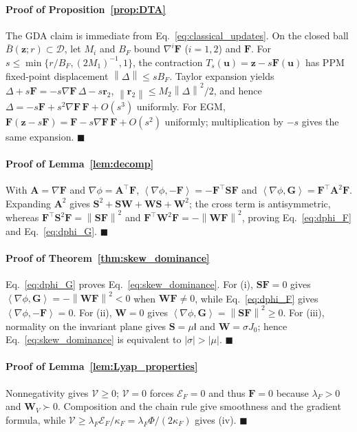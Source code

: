 \documentclass{article}
\theoremstyle{remark}
\newcommand{\inner}[2]{\left\langle #1,#2\right\rangle}
\newcommand{\norm}[1]{\left\lVert #1\right\rVert}
\newcommand{\Id}{\mathsf{I}}
\newcommand{\cD}{\mathcal{D}}
\newcommand{\bz}{\boldsymbol{z}}
\newcommand{\bu}{\boldsymbol{u}}
\newcommand{\bW}{\boldsymbol{W}}
\newcommand{\bS}{\boldsymbol{S}}
\newcommand{\bA}{\boldsymbol{A}}
\newcommand{\bF}{\boldsymbol{F}}
\newcommand{\bG}{\boldsymbol{G}}
\newcommand{\Vk}{\mathcal{V}}
\newcommand{\cE}{\mathcal{E}}
\begin{document}
\paragraph{Proof of Proposition~\ref{prop:DTA}}\label{app:DTA}
The GDA claim is immediate from Eq.~\eqref{eq:classical_updates}.
On the closed ball $\bar B(\bz;r)\subset\cD$, let $M_i$ and $B_F$ bound $\nabla^i\bF$ ($i=1,2$) and $\bF$.
For $s\le\min\{r/B_F,(2M_1)^{-1},1\}$, the contraction $T_s(\bu)=\bz-s\bF(\bu)$ has PPM fixed-point displacement $\norm{\Delta}\le sB_F$.
Taylor expansion yields $\Delta+s\bF=-s\nabla\bF\,\Delta-s\mathbf r_2$, $\norm{\mathbf r_2}\le M_2\norm{\Delta}^2/2$, and hence $\Delta=-s\bF+s^2\nabla\bF\,\bF+O(s^3)$ uniformly.
For EGM, $\bF(\bz-s\bF)=\bF-s\nabla\bF\,\bF+O(s^2)$ uniformly; multiplication by $-s$ gives the same expansion.
\hfill$\blacksquare$

\paragraph{Proof of Lemma~\ref{lem:decomp}}\label{app:decomp}
With $\bA=\nabla\bF$ and $\nabla\phi=\bA^\top\bF$, $\inner{\nabla\phi}{-\bF}=-\bF^\top\bS\bF$ and $\inner{\nabla\phi}{\bG}=\bF^\top\bA^2\bF$.
Expanding $\bA^2$ gives $\bS^2+\bS\bW+\bW\bS+\bW^2$; the cross term is antisymmetric, whereas $\bF^\top\bS^2\bF=\norm{\bS\bF}^2$ and $\bF^\top\bW^2\bF=-\norm{\bW\bF}^2$, proving Eq.~\eqref{eq:dphi_F} and Eq.~\eqref{eq:dphi_G}.
\hfill$\blacksquare$

\paragraph{Proof of Theorem~\ref{thm:skew_dominance}}\label{app:skew_dominance}
Eq.~\eqref{eq:dphi_G} proves Eq.~\eqref{eq:skew_dominance}.
For (i), $\bS\bF=0$ gives $\inner{\nabla\phi}{\bG}=-\norm{\bW\bF}^{2}<0$ when $\bW\bF\ne0$, while Eq.~\eqref{eq:dphi_F} gives $\inner{\nabla\phi}{-\bF}=0$.
For (ii), $\bW=0$ gives $\inner{\nabla\phi}{\bG}=\norm{\bS\bF}^{2}\ge0$.
For (iii), normality on the invariant plane gives $\bS=\mu\Id$ and $\bW=\sigma J_0$; hence Eq.~\eqref{eq:skew_dominance} is equivalent to $\lvert\sigma\rvert>\lvert\mu\rvert$.
\hfill$\blacksquare$

\paragraph{Proof of Lemma~\ref{lem:Lyap_properties}}\label{app:Lyap_properties}
Nonnegativity gives $\Vk\ge0$; $\Vk=0$ forces $\cE_F=0$ and thus $\bF=0$ because $\lambda_F>0$ and $\bW_V\succ0$.
Composition and the chain rule give smoothness and the gradient formula, while $\Vk\ge\lambda_F\cE_F/\kappa_F=\lambda_F\Phi/(2\kappa_F)$ gives (iv).
\hfill$\blacksquare$
\end{document}
